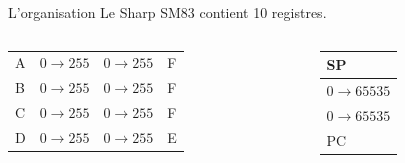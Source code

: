 \documentclass{beamer}
\begin{document}
    \begin{frame}{L'organisation}
        Le Sharp SM83 contient 10 registres.
        \begin{columns}
            \begin{column}{0.5\textwidth}
                \renewcommand{\arraystretch}{2} 
                \begin{tabular}{ m{0.1cm} | m{1.4cm} | m{1.4cm} | m{0.1cm} } 
                    \cline{2-3}
                    A
                    &$0 \rightarrow 255$
                    &$0 \rightarrow 255$
                    & F \\
                    \cline{2-3}
                    B
                    &$0 \rightarrow 255$
                    &$0 \rightarrow 255$
                    & F \\
                    \cline{2-3}
                    C
                    &$0 \rightarrow 255$
                    &$0 \rightarrow 255$
                    & F \\ 
                    \cline{2-3}
                    D
                    &$0 \rightarrow 255$
                    &$0 \rightarrow 255$
                    & E \\
                    \cline{2-3}
                \end{tabular}
            \end{column}
            \begin{column}{0.4\textwidth}
                \begin{center}
                    \renewcommand{\arraystretch}{1.2} 
                    \begin{tabular}{| m{1.8cm} |}
                        \multicolumn{1}{m{1.8cm}}{SP}\\ 
                        \hline
                        $0 \rightarrow 65535$\\
                        \hline
                        $0 \rightarrow 65535$\\
                        \hline
                        \multicolumn{1}{m{1.8cm}}{PC}\\ 
                    \end{tabular}
                \end{center}
            \end{column}
        \end{columns}
    \end{frame}
\end{document}
